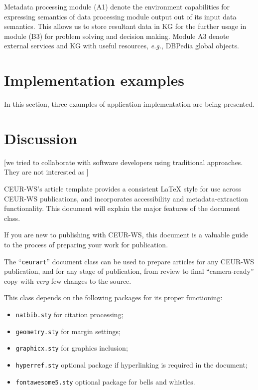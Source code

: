 \documentclass[
]{ceurart}
\begin{document}
Metadata processing module (A1) denote the environment capabilities for expressing semantics of data processing module output out of its input data semantics.  This allows us to store resultant data in KG for the further usage in module (B3) for problem solving and decision making.  Module A3 denote external services and KG with useful resources, \emph{e.g.}, DBPedia global objects.

\section{Implementation examples}

In this section, three examples of application implementation are being presented.


\section{Discussion}
\label{sec:disc}


[we tried to collaborate with software developers using traditional approaches.  They are not interested as ]


CEUR-WS's article template provides a consistent \LaTeX{} style for
use across CEUR-WS publications, and incorporates accessibility and
metadata-extraction functionality. This document will explain the
major features of the document class.

If you are new to publishing with CEUR-WS, this document is a valuable
guide to the process of preparing your work for publication.

The ``\verb|ceurart|'' document class can be used to prepare articles
for any CEUR-WS publication, and for any stage of publication, from
review to final ``camera-ready'' copy with {\itshape very} few changes
to the source.

This class depends on the following packages
for its proper functioning:

\begin{itemize}
\item \verb|natbib.sty| for citation processing;
\item \verb|geometry.sty| for margin settings;
\item \verb|graphicx.sty| for graphics inclusion;
\item \verb|hyperref.sty| optional package if hyperlinking is required in
  the document;
\item \verb|fontawesome5.sty| optional package for bells and whistles.
\end{itemize}
\end{document}
